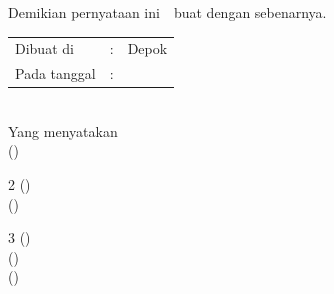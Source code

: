 \noindent Demikian pernyataan ini~\ifx\blank{}\fi~buat dengan sebenarnya.



\begin{center}
	\vspace*{0.8cm}
	\begin{tabular}{lll}
		Dibuat di&: & Depok \\
		Pada tanggal&: & \tanggalSiapSidang \\
	\end{tabular}\\

	\vspace*{0.2cm}
	Yang menyatakan \\
	\ifx\blank\npmDua
		\vspace*{2cm}
		(\penulisSatu) \\
	\else
		\ifx\blank\npmTiga
			\begin{multicols}{2}
				\vspace*{0.5cm}
				(\penulisSatu) \\

				\vspace*{0.5cm}
				(\penulisDua) \\
			\end{multicols}
		\else
			\begin{multicols}{3}
				\vspace*{0.5cm}
				(\penulisSatu) \\

				\vspace*{0.5cm}
				(\penulisDua) \\

				\vspace*{0.5cm}
				(\penulisTiga) \\
			\end{multicols}
		\fi
	\fi
\end{center}

\newpage
